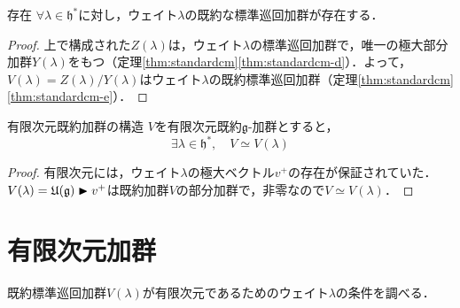 \documentclass[rep_main]{subfiles}
\begin{document}
\begin{mytheo}[label=thm:standardcm-exist]{存在}
	$\forall \lambda \in \mathfrak{h}^*$に対し，ウェイト$\lambda$の既約な標準巡回加群が存在する．
\end{mytheo}
\begin{proof}
	上で構成された$Z(\lambda)$は，ウェイト$\lambda$の標準巡回加群で，唯一の極大部分加群$Y(\lambda)$をもつ（定理\ref{thm:standardcm}\ref{thm:standardcm-d}）．よって，$V(\lambda) = Z(\lambda) / Y(\lambda)$はウェイト$\lambda$の既約標準巡回加群（定理\ref{thm:standardcm}\ref{thm:standardcm-e}）．
\end{proof}
\begin{mytheo}[label=thm:finite-irr-mod]{有限次元既約加群の構造}
	$V$を有限次元既約$\mathfrak{g}$-加群とすると，
	\begin{equation}
		\exists \lambda \in \mathfrak{h}^*,\quad  V \simeq V(\lambda)
	\end{equation}
\end{mytheo}
\begin{proof}
	有限次元には，ウェイト$\lambda$の極大ベクトル$v^+$の存在が保証されていた．$V(\lambda) = \mathfrak{U}(\mathfrak{g}) \blacktriangleright v^+$は既約加群$V$の部分加群で，非零なので$V \simeq V(\lambda)$．
\end{proof}

\section{有限次元加群}
既約標準巡回加群$V(\lambda)$が有限次元であるためのウェイト$\lambda$の条件を調べる．
\end{document}

